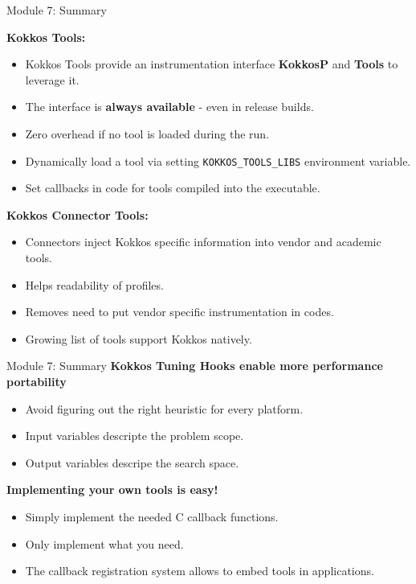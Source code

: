 



% 

\begin{frame}[fragile]{Module 7: Summary}

\textbf{Kokkos Tools:}
\begin{itemize}
  \item Kokkos Tools provide an instrumentation interface \textbf{KokkosP} and \textbf{Tools} to leverage it.
  \item The interface is \textbf{always available} - even in release builds.
  \item Zero overhead if no tool is loaded during the run.
  \item Dynamically load a tool via setting \texttt{KOKKOS\_TOOLS\_LIBS} environment variable.
  \item Set callbacks in code for tools compiled into the executable. 
\end{itemize}

\textbf{Kokkos Connector Tools:}
\begin{itemize}
  \item Connectors inject Kokkos specific information into vendor and academic tools.
  \item Helps readability of profiles.
  \item Removes need to put vendor specific instrumentation in codes.
  \item Growing list of tools support Kokkos natively.
\end{itemize}
\end{frame}

\begin{frame}[fragile]{Module 7: Summary}
\textbf{Kokkos Tuning Hooks enable more performance portability}
\begin{itemize}
  \item Avoid figuring out the right heuristic for every platform.
  \item Input variables descripte the problem scope.
  \item Output variables descripe the search space.
\end{itemize}

\textbf{Implementing your own tools is easy!}
\begin{itemize}
  \item Simply implement the needed C callback functions.
  \item Only implement what you need.
  \item The callback registration system allows to embed tools in applications.
\end{itemize}

\end{frame}

